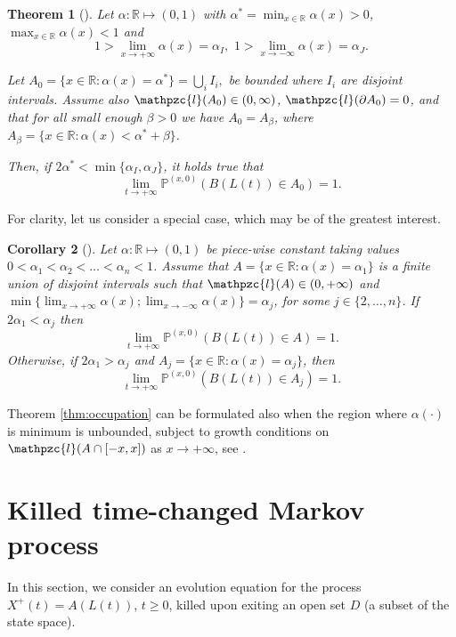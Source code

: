 \documentclass[reqno]{amsart}
\newtheorem{theorem}{Theorem}[section] %
\newtheorem{corollary}[theorem]{Corollary}
\theoremstyle{remark}
\numberwithin{equation}{section} %
\newcommand{\1}{\mathds{1}}
\begin{document}
	\begin{theorem}[{\cite[Theorem 4.13]{savtoa}}]
		\label{thm:hyp}
		Let  $\alpha:\mathbb{R}\mapsto (0,1)$ with $\alpha^*=\min_{x\in\mathbb{R}}\alpha(x)>0$, $\max_{x\in\mathbb{R}}\alpha(x)<1$ and \[1>\lim_{x\to +\infty}\alpha(x)=\alpha_I,\,\,1>\lim_{x\to -\infty}\alpha(x)=\alpha_J.\]
		
		Let $A_0=\{x\in\mathbb{R}:\alpha(x)=\alpha^*\}=\bigcup_i I_i,$ be bounded where $I_i$ are disjoint intervals. Assume also $\mathpzc{l}({A_0})\in({0,\infty})$, $\mathpzc{l}({\partial A_0})=0$, and that for all small enough $\beta>0$ we have  $A_0=A_\beta$, where $A_\beta=\{x\in\mathbb{R}:\alpha(x)<\alpha^*+\beta\}$.
		
		Then, if $2\alpha^*<\min\{\alpha_I,\alpha_J\}$, it holds true that 
		\begin{equation}\label{eq:hyp}
			\lim_{t \to +\infty}\mathds{P}^{(x,0)}({B(L(t))\in A_0})=1.
		\end{equation}
	\end{theorem}
	For clarity, let us consider a special case, which may be of the greatest interest.
	\begin{corollary}[{\cite[Corollary 4.14]{savtoa}}]\label{cor:conseq}
		Let   $\alpha:\mathbb{R}\mapsto (0,1)$ be piece-wise constant taking values $0<\alpha_1<\alpha_2<\dots<\alpha_n<1$. Assume that $A=\{x\in\mathbb{R}:\alpha(x)=\alpha_1\}$ is a finite union of disjoint intervals such that $\mathpzc{l}({A})\in(0, +\infty)$ and $\min\{\lim_{x\to +\infty}\alpha(x);\lim_{x\to -\infty}\alpha(x)\}=\alpha_j$, for some $j\in\{2,\dots,n\}$. If $2\alpha_1<\alpha_j$ then 
		\begin{equation}\label{eq:hyp1}
			\lim_{t\to +\infty}\mathds{P}^{(x,0)}({B(L(t))\in A})=1.
		\end{equation}
		Otherwise, if $2\alpha_1>\alpha_j$ and $A_j=\{x\in \mathbb{R}:\alpha(x)=\alpha_j\}$, then
		\begin{equation}\label{eq:hyp2}
			\lim_{t\to +\infty}\mathds{P}^{(x,0)}({B(L(t))\in A_j})=1.
		\end{equation}
	\end{corollary}
	Theorem \ref{thm:occupation} can be formulated also when the region where $\alpha(\cdot)$ is minimum is unbounded, subject to growth conditions on $\mathpzc{l}(A \cap [-x,x])$ as $x \to +\infty$, see \cite[Section 4.2]{savtoa}.
	
	
	
	
	
	
	\section{Killed time-changed Markov process}
	\label{section_killed}
	In this section, we consider an evolution equation for the process $X^+(t) = A(L(t))$, $t\ge0$, killed upon exiting an open set $D$ (a subset of the state space). 
	
\end{document}
